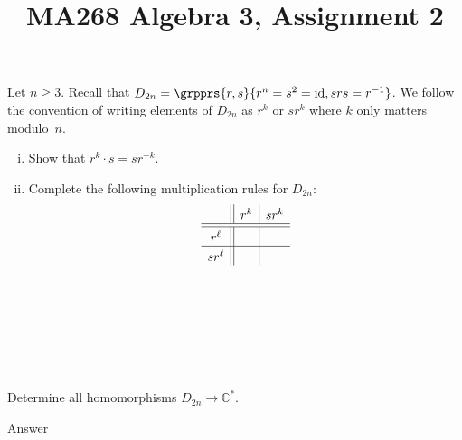 \documentclass[a4paper]{article}
\title{MA268 Algebra 3, Assignment 2}
\begin{document}
\maketitle

\setlength{\parindent}{0em}
\setlength{\parskip}{1em}


\begin{questionbody}
Let $n \ge 3$. Recall that $D_{2n} = \grpprs{r, s}{r^n = s^2 = \mathrm{id}, srs = r^{-1}}$. We follow the convention of writing elements of $D_{2n}$ as $r^k$ or $sr^k$ where $k$ only matters modulo~$n$.
\begin{enumerate}[(i)]
\item Show that $r^k \cdot s = sr^{-k}$.

\item Complete the following multiplication rules for $D_{2n}$:
\[
\setlength{\extrarowheight}{3pt}%
\begin{array}{c||c|c} %
    & r^k & s r^k \\
\hline \hline %
r^\ell && \\
\hline %
s r^\ell  && \\
\end{array}
\]
\end{enumerate}
\end{questionbody}

\subsection{~} %
\subsection{~} %



\begin{questionbody}
Determine all homomorphisms $D_{2n} \to \mathbb{C}^*$.
\end{questionbody}

Answer


\end{document}
